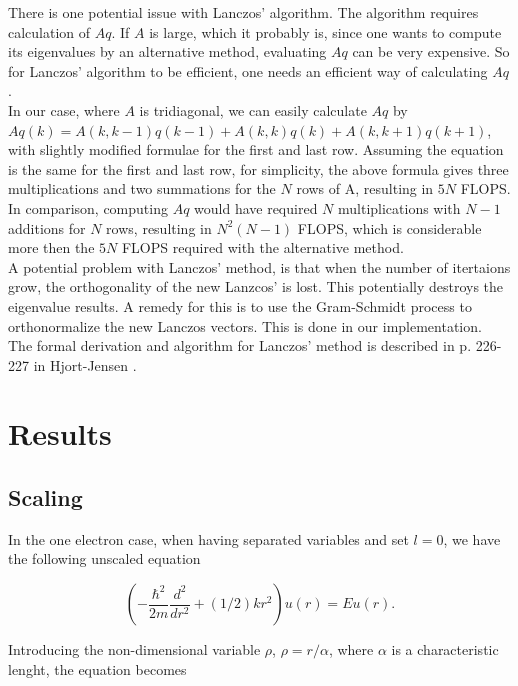 \documentclass{article}
\begin{document}
There is one potential issue with Lanczos' algorithm. The algorithm requires calculation of $Aq$. If $A$ is large, which it probably is, since one wants to compute its eigenvalues by an alternative method, evaluating $Aq$ can be very expensive. So for Lanczos' algorithm to be efficient, one needs an efficient way of calculating $Aq$. \\

In our case, where $A$ is tridiagonal, we can easily calculate $Aq$ by $Aq(k) = A(k,k-1)q(k-1) + A(k,k)q(k) + A(k,k+1)q(k+1)$, with slightly modified formulae for the first and last row. Assuming the equation is the same for the first and last row, for simplicity, the above formula gives three multiplications and two summations for the $N$ rows of A, resulting in $5N$ FLOPS. In comparison, computing $Aq$ would have required $N$ multiplications with $N-1$ additions for $N$ rows, resulting in $N^2(N-1)$ FLOPS, which is considerable more then the $5N$ FLOPS required with the alternative method. \\

A potential problem with Lanczos' method, is that when the number of itertaions grow, the orthogonality of the  new Lanzcos' is lost. This potentially destroys the eigenvalue results. A remedy for this is to use the Gram-Schmidt process to orthonormalize the new Lanczos vectors. This is done in our implementation.\\

The formal derivation and algorithm for Lanczos' method is described in p. 226-227 in Hjort-Jensen \cite{MHJ}.

\section{Results}

\subsection{Scaling}

In the one electron case, when having separated variables and set $l = 0$, we have the following unscaled equation

\begin{equation}\label{eq:1electronUnscaled}
 \left (-\frac{\hbar^2}{2 m} \frac{d^2}{dr^2} 
 + (1/2)kr^2 
\right ) u(r)  = E u(r) .
\end{equation}

Introducing the non-dimensional variable $\rho$, $\rho = r/\alpha$, where $\alpha$ is a characteristic lenght, the equation becomes
\end{document}
